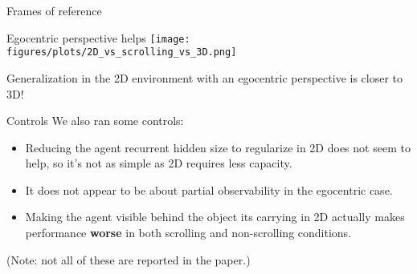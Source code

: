 \documentclass{beamer}
\begin{document}
\begin{frame}{Frames of reference}
\end{frame}

\begin{frame}{Egocentric perspective helps}
\vspace{1em}
\centering
\texttt{[image: figures/plots/2D\_vs\_scrolling\_vs\_3D.png]}
\end{frame}

\begin{frame}[standout]
Generalization in the 2D environment with an egocentric perspective is closer to 3D!
\end{frame}

\begin{frame}{Controls}
We also ran some controls:
\begin{itemize}
\item Reducing the agent recurrent hidden size to regularize in 2D does not seem to help, so it's not as simple as 2D requires less capacity. 
\item It does not appear to be about partial observability in the egocentric case.
\item Making the agent visible behind the object its carrying in 2D actually makes performance \textbf{worse} in both scrolling and non-scrolling conditions.
\end{itemize}
(Note: not all of these are reported in the paper.)
\end{frame}
\end{document}
